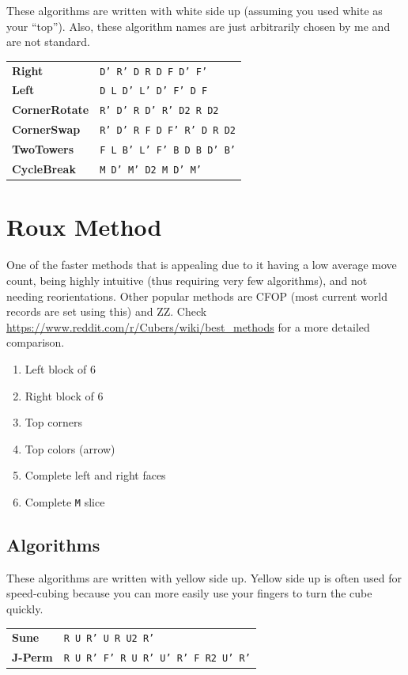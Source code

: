 \documentclass[10pt,landscape]{cheatsheet}
\newcommand{\mitem}[2]{\textbf{#1} & \texttt{#2} \\}
\begin{document}
\begin{multicols}{3}
These algorithms are written with white side up (assuming you used white as your ``top'').
Also, these algorithm names are just arbitrarily chosen by me and are not standard.

\begin{tabular}{ll}
    \toprule
    \mitem{Right}{D' R' D R D F D' F'}
    \mitem{Left}{D L D' L' D' F' D F}
    \midrule
    \mitem{CornerRotate}{R' D' R D' R' D2 R D2}
    \mitem{CornerSwap}{R' D' R F D F' R' D R D2}
    \mitem{TwoTowers}{F L B' L' F' B D B D' B'}
    \mitem{CycleBreak}{M D' M' D2 M D' M'}
    \bottomrule
\end{tabular}

\vfill

\section{Roux Method}

One of the faster methods that is appealing due to it having a low average move count, being highly intuitive (thus requiring very few algorithms), and not needing reorientations.
Other popular methods are CFOP (most current world records are set using this) and ZZ.
Check \url{https://www.reddit.com/r/Cubers/wiki/best_methods} for a more detailed comparison.

\begin{enumerate}
    \item Left block of 6
    \item Right block of 6
    \item Top corners
    \item Top colors (arrow)
    \item Complete left and right faces
    \item Complete \texttt{M} slice
\end{enumerate}

\subsection{Algorithms}

These algorithms are written with yellow side up.
Yellow side up is often used for speed-cubing because you can more easily use your fingers to turn the cube quickly.

\begin{tabular}{ll}
    \toprule
    \mitem{Sune}{R U R' U R U2 R'}
    \mitem{J-Perm}{R U R' F' R U R' U' R' F R2 U' R'}
    \bottomrule
\end{tabular}

\end{multicols}
\end{document}
